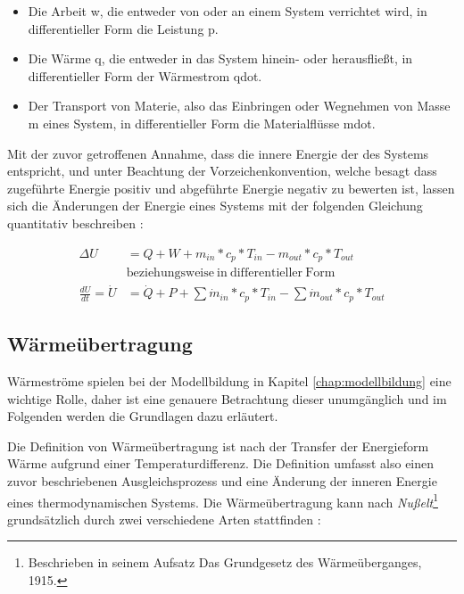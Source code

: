\begin{itemize}
	\item Die Arbeit \gls{w}, die entweder von oder an einem System verrichtet wird, in differentieller Form die Leistung \gls{p}.
	\item Die Wärme \gls{q}, die entweder in das System hinein- oder herausfließt, in differentieller Form der Wärmestrom \gls{qdot}.
	\item Der Transport von Materie, also das Einbringen oder Wegnehmen von Masse \gls{m} eines System, in differentieller Form die Materialflüsse \gls{mdot}.
\end{itemize}

Mit der zuvor getroffenen Annahme, dass die innere Energie der des Systems entspricht, und unter Beachtung der Vorzeichenkonvention, welche besagt dass zugeführte Energie positiv und abgeführte Energie negativ zu bewerten ist, lassen sich die Änderungen der Energie eines Systems mit der folgenden Gleichung quantitativ beschreiben \cite[S.~54]{ba12}:

\begin{equation}
\label{eq:hauptsatz}
\begin{split}
\Delta U & = Q + W + m_{in}*c_{p}*T_{in}-m_{out}*c_{p}*T_{out} \\ ~& \mathrm{beziehungsweise~in~differentieller~Form}\\
\frac{dU}{dt}=\dot{U} & =\dot{Q}+P+\sum\dot{m}_{in}*c_{p}*T_{in}-\sum\dot{m}_{out}*c_{p}*T_{out}
\end{split}
\end{equation}



\subsection{Wärmeübertragung}

Wärmeströme spielen bei der Modellbildung in Kapitel \ref{chap:modellbildung} eine wichtige Rolle, daher ist eine genauere Betrachtung dieser unumgänglich und im Folgenden werden die Grundlagen dazu erläutert.

Die Definition von Wärmeübertragung ist nach \cite[S.~1]{bo14} \Gun [...] der Transfer der Energieform Wärme aufgrund einer Temperaturdifferenz. \Gun Die Definition umfasst also einen zuvor beschriebenen Ausgleichsprozess und eine Änderung der inneren Energie eines thermodynamischen Systems.
Die Wärmeübertragung kann nach \textit{Nußelt}\footnote{Beschrieben in seinem Aufsatz \Gun Das Grundgesetz des Wärmeüberganges\Gob , 1915.} grundsätzlich durch zwei verschiedene Arten stattfinden \cite[S.~3f.]{bo14}:

